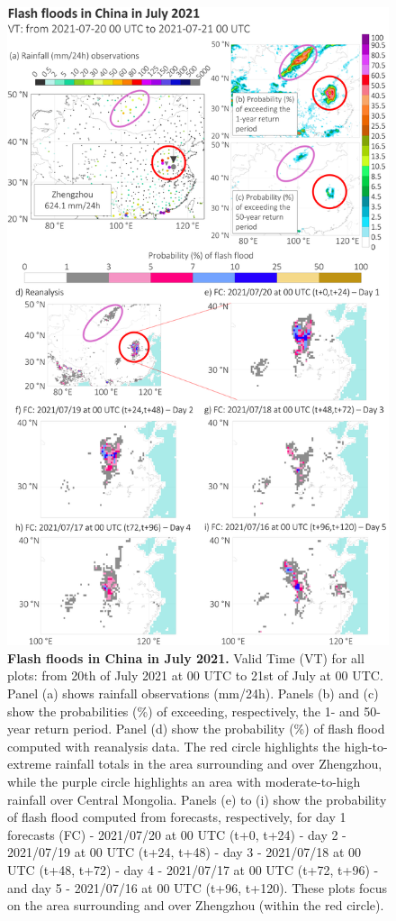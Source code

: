 \begin{figure}[htbp]
\centering
\includegraphics[width=\textwidth]{case_study_china.png}
\caption{\textbf{Flash floods in China in July 2021.} Valid Time (VT) for all plots: from 20th of July 2021 at 00 UTC to 21st of July at 00 UTC. Panel (a) shows rainfall observations (mm/24h). Panels (b) and (c) show the probabilities (\%) of exceeding, respectively, the 1- and 50-year return period. Panel (d) show the probability (\%) of flash flood computed with reanalysis data. The red circle highlights the high-to-extreme rainfall totals in the area surrounding and over Zhengzhou, while the purple circle highlights an area with moderate-to-high rainfall over Central Mongolia. Panels (e) to (i) show the probability of flash flood computed from forecasts, respectively, for day 1 forecasts (FC) - 2021/07/20 at 00 UTC (t+0, t+24) - day 2 - 2021/07/19 at 00 UTC (t+24, t+48) - day 3 - 2021/07/18 at 00 UTC (t+48, t+72) - day 4 - 2021/07/17 at 00 UTC (t+72, t+96) - and day 5 - 2021/07/16 at 00 UTC (t+96, t+120). These plots focus on the area surrounding and over Zhengzhou (within the red circle).}
\label{fig:case_study_china}
\end{figure}


